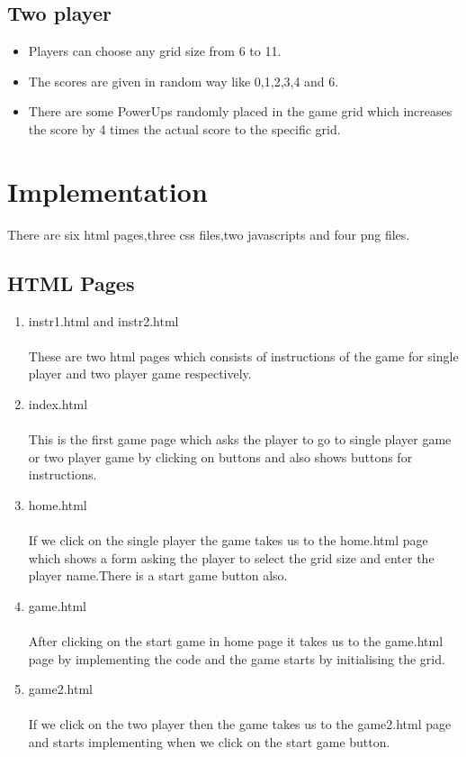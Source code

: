 \documentclass[12pt]{article}
\begin{document}
\subsection{Two player}

\begin{itemize}
    \item Players can choose any grid size from 6 to 11.
    \item The scores are given in random way like 0,1,2,3,4 and 6.
    \item There are some PowerUps randomly placed in the game grid which increases the score by 4 times the actual score to the specific grid.
\end{itemize}

\section{Implementation}
There are six html pages,three css files,two javascripts and four png files.
\subsection{HTML Pages}
\begin{enumerate}
    \item instr1.html and instr2.html\\\\These are two html pages which consists of instructions of the game for single player and two player game respectively.
    \item index.html\\\\This is the first game page which asks the player to go to single player game or two player game by clicking on buttons and also shows buttons for instructions.
    \item home.html\\\\If we click on the single player the game takes us to the home.html page which shows a form asking the player to select the grid size and enter the player name.There is a start game button also.
    \item game.html\\\\After clicking on the start game in home page it takes us to the game.html page by implementing the code and the game starts by initialising the grid.
    \item game2.html\\\\If we click on the two player then the game takes us to the game2.html page and starts implementing when we click on the start game button.
\end{enumerate}
\end{document}
